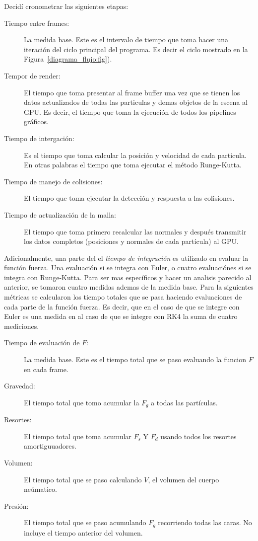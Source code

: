 Decidí cronometrar las siguientes etapas:
\begin{description}
 \item[Tiempo entre frames:] La medida base. Este es el intervalo  de tiempo que toma hacer una iteración del ciclo principal del programa. Es decir el ciclo mostrado en la Figura~\ref{diagrama_flujo:fig}).
 \item[Tempor de render:] El tiempo que toma presentar al frame buffer una vez que se tienen los datos actualizados de todas las particulas y demas objetos de la escena al GPU. Es decir, el tiempo que toma la ejecución de todos los pipelines gráficos.
 \item[Tiempo de intergación:] Es el tiempo que toma calcular la posición y velocidad de cada particula. En otras palabras el tiempo que toma ejecutar el método Runge-Kutta.
 \item[Tiempo de manejo de colisiones:] El tiempo que toma ejecutar la detección y respuesta a las colisiones.
 \item[Tiempo de actualización de la malla:] El tiempo que toma primero recalcular las normales y después transmitir los datos completos (posiciones y normales de cada partícula) al GPU.
\end{description}

Adicionalmente, una parte del el \emph{tiempo de integración} es utilizado en evaluar la función fuerza.
Una evaluación si se integra con Euler, o cuatro evaluaciónes si se integra con Runge-Kutta.
Para ser mas específicos y hacer un analisis parecido al anterior, se tomaron cuatro medidas ademas de la medida base.
Para la siguientes métricas se calcularon los tiempo totales que se pasa haciendo evaluaciones de cada parte de la función fuerza.
Es decir, que en el caso de que se integre con Euler es una medida en al caso de que se integre con RK4 la suma de cuatro mediciones.

\begin{description}
 \item[Tiempo de evaluación de $F$:] La medida base. Este es el tiempo total que se paso evaluando la funcion $F$ en cada frame.
 \item[Gravedad:] El tiempo total que tomo acumular la $F_g$ a todas las partículas.
 \item[Resortes:] El tiempo total que toma acumular $F_s$ Y $F_d$ usando todos los resortes amortiguuadores.
 \item[Volumen:] El tiempo total que se paso calculando $V$, el volumen del cuerpo neúmatico.
 \item[Presión:] El tiempo total que se paso acumulando $F_g$ recorriendo todas las caras. No incluye el tiempo anterior del volumen.
\end{description}

